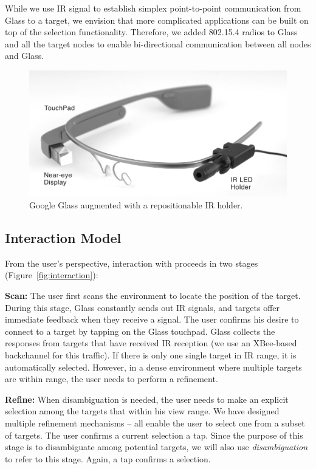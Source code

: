 While we use IR signal to establish simplex point-to-point communication from Glass to a target, we envision that more complicated applications can be built on top of the selection functionality. Therefore, we added 802.15.4 radios to Glass and all the target nodes to enable bi-directional communication between all nodes and Glass. 

\begin{figure}[t]
\centering
\includegraphics[width=0.9\columnwidth]{figures/GlassWithHolder.jpg}
\caption{Google Glass augmented with a repositionable IR holder.}
\label{fig:glass}
\end{figure}

\subsection{Interaction Model}
From the user's perspective, interaction with \systemname proceeds in two stages (Figure~\ref{fig:interaction}): 

{\bf Scan:} The user first scans the environment to locate the position of the target. During this stage, Glass constantly sends out IR signals, and  targets offer immediate feedback when they receive a signal. The user confirms his desire to connect to a target by tapping on the Glass touchpad. Glass collects the responses from targets that have received IR reception (we use an XBee-based backchannel for this traffic). If there is only one single target in IR range, it is automatically selected. However, in a dense environment where multiple targets are within range, the user needs to perform a refinement.

{\bf Refine:} When disambiguation is needed, the user needs to make an explicit selection among the targets that within his view range. We have designed multiple refinement mechanisms -- all enable the user to select one from a subset of targets. The user confirms a current selection a tap. Since the purpose of this stage is to disambiguate among potential targets, we will also use {\em disambiguation} to refer to this stage. Again, a tap confirms a selection.

